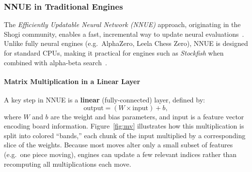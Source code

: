 \documentclass[12pt,a4paper]{article}
\begin{document}
\subsubsection{NNUE in Traditional Engines}
\label{sec:nnue_background}

The \emph{Efficiently Updatable Neural Network (NNUE)} approach, originating in the Shogi community, enables a fast, incremental way to update neural evaluations~\cite{Nasu2018}. Unlike fully neural engines (e.g.\ AlphaZero, Leela Chess Zero), NNUE is designed for standard CPUs, making it practical for engines such as \emph{Stockfish} when combined with alpha-beta search~\cite{StockfishNNUE2020}.

\paragraph{Matrix Multiplication in a Linear Layer}
A key step in NNUE is a \textbf{linear} (fully-connected) layer, defined by:
\[
\text{output} = (W \times \text{input}) + b,
\]
where \(W\) and \(b\) are the weight and bias parameters, and \(\text{input}\) is a feature vector encoding board information. Figure~\ref{fig:mv} illustrates how this multiplication is split into colored “bands,” each chunk of the input multiplied by a corresponding slice of the weights. Because most moves alter only a small subset of features (e.g.\ one piece moving), engines can update a few relevant indices rather than recomputing all multiplications each move.
\end{document}

